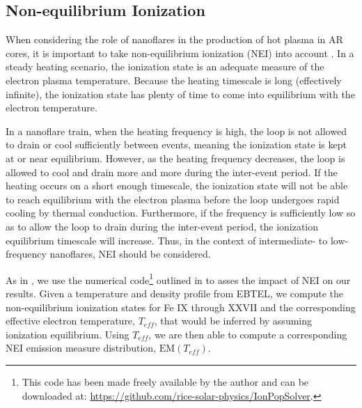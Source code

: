 \documentclass[preprint,linenumbers]{aastex}
\begin{document}
	\subsection{Non-equilibrium Ionization}
	\label{subsec:nei}
	\par When considering the role of nanoflares in the production of hot plasma in AR cores, it is important to take non-equilibrium ionization (NEI) into account \citep{bradshaw_explosive_2006,reale_nonequilibrium_2008,barnes_inference_2016}. In a steady heating scenario, the ionization state is an adequate measure of the electron plasma temperature. Because the heating timescale is long (effectively infinite), the ionization state has plenty of time to come into equilibrium with the electron temperature.
	\par In a nanoflare train, when the heating frequency is high, the loop is not allowed to drain or cool sufficiently between events, meaning the ionization state is kept at or near equilibrium. However, as the heating frequency decreases, the loop is allowed to cool and drain more and more during the inter-event period. If the heating occurs on a short enough timescale, the ionization state will not be able to reach equilibrium with the electron plasma before the loop undergoes rapid cooling by thermal conduction. Furthermore, if the frequency is sufficiently low so as to allow the loop to drain during the inter-event period, the ionization equilibrium timescale will increase. Thus, in the context of intermediate- to low-frequency nanoflares, NEI should be considered.
	\par As in , we use the numerical code\footnote{This code has been made freely available by the author and can be downloaded at: \url{https://github.com/rice-solar-physics/IonPopSolver}.} outlined in \citet{bradshaw_numerical_2009} to asses the impact of NEI on our results. Given a temperature and density profile from EBTEL, we compute the non-equilibrium ionization states for Fe IX through XXVII and the corresponding effective electron temperature, $T_{eff}$, that would be inferred by assuming ionization equilibrium. Using $T_{eff}$, we are then able to compute a corresponding NEI emission measure distribution, $\mathrm{EM}(T_{eff})$.
\end{document}
